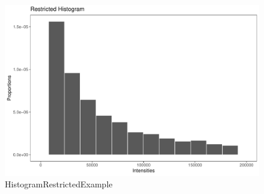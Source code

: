 \documentclass{article}
\begin{document}
	\begin{figure}
		\centering
		\includegraphics[width=1\linewidth]{HistogramRestrictedExample.pdf}
		\caption{HistogramRestrictedExample}
		\label{fig:HistogramRestrictedExample}
	\end{figure}
\end{document}
